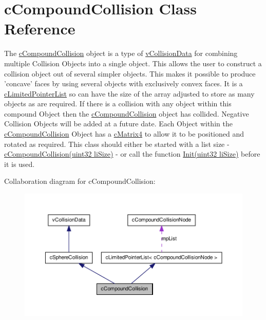 \hypertarget{classc_compound_collision}{
\section{cCompoundCollision Class Reference}
\label{classc_compound_collision}
}


The \hyperlink{classc_compound_collision}{cCompoundCollision} object is a type of \hyperlink{classv_collision_data}{vCollisionData} for combining multiple Collision Objects into a single object. This allows the user to construct a collision object out of several simpler objects. This makes it possible to produce 'concave' faces by using several objects with exclusively convex faces. It is a \hyperlink{classc_limited_pointer_list}{cLimitedPointerList} so can have the size of the array adjusted to store as many objects as are required. If there is a collision with any object within this compound Object then the \hyperlink{classc_compound_collision}{cCompoundCollision} object has collided. Negative Collision Objects will be added at a future date. Each Object within the \hyperlink{classc_compound_collision}{cCompoundCollision} Object has a \hyperlink{classc_matrix4}{cMatrix4} to allow it to be positioned and rotated as required. This class should either be started with a list size -\/ \hyperlink{classc_compound_collision_a8769934e6b4193ad31663288f8f55d0a}{cCompoundCollision(uint32 liSize)} -\/ or call the function \hyperlink{classc_limited_pointer_list_ab72b03a5d82ee318bf21d3102bdfecda}{Init(uint32 liSize)} before it is used.  




Collaboration diagram for cCompoundCollision:\nopagebreak
\begin{figure}[H]
\begin{center}
\leavevmode
\includegraphics[width=400pt]{classc_compound_collision__coll__graph}
\end{center}
\end{figure}
